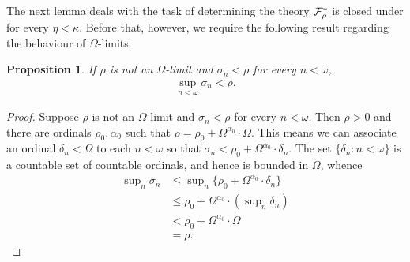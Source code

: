 \documentclass[UKenglish,cleveref,DIV=12]{scrartcl}
\newtheorem{proposition}[lemma]{Proposition}
\theoremstyle{definition}
\theoremstyle{definition}
\begin{document}
%
%

The next lemma deals with the task of determining the theory $\mathcal{F}^*_\rho$ is
closed under \Conec\eta for every $\eta<\kappa$. Before that, however, we require the following result regarding the behaviour of $\Omega$-limits.
\begin{proposition}\label{extlem:ordOlimit}
 If $\rho$ is not an $\Omega$-limit and $\sigma_n<\rho$ for every $n<\omega$,
 \begin{align*}
  \sup_{n<\omega}\sigma_n<\rho.
 \end{align*}
\end{proposition}
\begin{proof}
Suppose $\rho$ is not an $\Omega$-limit and $\sigma_n<\rho$ for every $n<\omega$.
Then $\rho>0$ and there are ordinals $\rho_0,\alpha_0$ such that
$\rho=\rho_0+\Omega^{\alpha_0}\cdot\Omega$. This means we can associate an
ordinal $\delta_n<\Omega$ to each $n<\omega$ so that
$\sigma_n<\rho_0+\Omega^{\alpha_0}\cdot\delta_n$. The set
$\{\delta_n:n<\omega\}$ is a countable set of countable ordinals, and hence is
bounded in $\Omega$, whence
\begin{align*}
\sup\nolimits_{n}\sigma_n&\le\sup\nolimits_{n}\{\rho_0+\Omega^{\alpha_0}\cdot\delta_n\}\\
  &\le \rho_0+\Omega^{\alpha_0}\cdot(\sup\nolimits_{n}\delta_n)\\
  &<\rho_0+\Omega^{\alpha_0}\cdot\Omega\\
  &=\rho.
\end{align*}
\end{proof}
\end{document}
